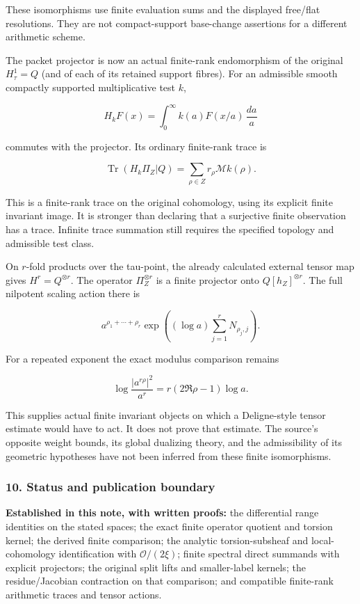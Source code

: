 These isomorphisms use finite evaluation sums and the displayed free/flat resolutions. They are not
compact-support base-change assertions for a different arithmetic scheme.

The packet projector is now an actual finite-rank endomorphism of the original \(H^1_\tau=Q\) (and
of each of its retained support fibres). For an admissible smooth compactly supported multiplicative
test \(k\),

\[H_kF(x)=\int_0^\infty k(a)F(x/a)\,\frac{da}{a}\]

commutes with the projector. Its ordinary finite-rank trace is

\[\boxed{\operatorname{Tr}(H_k\Pi_Z|Q)
=\sum_{\rho\in Z}r_\rho\mathcal Mk(\rho).}\]

This is a finite-rank trace on the original cohomology, using its explicit finite invariant image.
It is stronger than declaring that a surjective finite observation has a trace. Infinite trace
summation still requires the specified topology and admissible test class.

On \(r\)-fold products over the tau-point, the already calculated external tensor map gives
\(H^r=Q^{\otimes r}\). The operator \(\Pi_Z^{\otimes r}\) is a finite projector onto
\(Q[h_Z]^{\otimes r}\). The full nilpotent scaling action there is

\[a^{\rho_1+\cdots+\rho_r}
\exp\left((\log a)\sum_{j=1}^rN_{\rho_j,j}\right).\]

For a repeated exponent the exact modulus comparison remains

\[\log\frac{|a^{r\rho}|^2}{a^r}=r(2\Re\rho-1)\log a.\]

This supplies actual finite invariant objects on which a Deligne-style tensor estimate would have to
act. It does not prove that estimate. The source's opposite weight bounds, its global dualizing
theory, and the admissibility of its geometric hypotheses have not been inferred from these finite
isomorphisms.

\subsubsection{10. Status and publication boundary}\label{pr_8:status-and-publication-boundary}

\textbf{Established in this note, with written proofs:} the differential range identities on the
stated spaces; the exact finite operator quotient and torsion kernel; the derived finite comparison;
the analytic torsion-subsheaf and local-cohomology identification with \(\mathcal O/(2\xi)\); finite
spectral direct summands with explicit projectors; the original split lifts and smaller-label
kernels; the residue/Jacobian contraction on that comparison; and compatible finite-rank arithmetic
traces and tensor actions.

